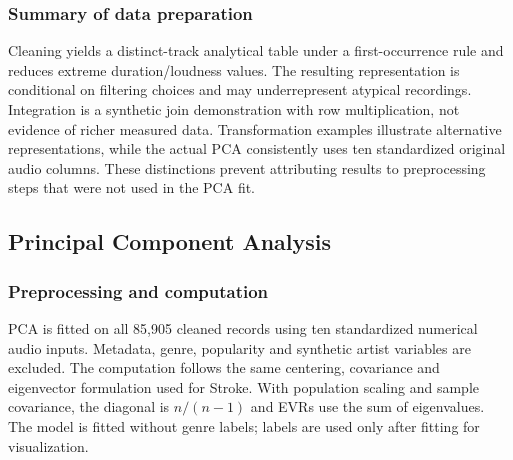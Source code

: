 \documentclass[12pt, a4paper]{article}
\begin{document}
\subsubsection{Summary of data preparation}
Cleaning yields a distinct-track analytical table under a first-occurrence rule and reduces extreme duration/loudness values. The resulting representation is conditional on filtering choices and may underrepresent atypical recordings. Integration is a synthetic join demonstration with row multiplication, not evidence of richer measured data. Transformation examples illustrate alternative representations, while the actual PCA consistently uses ten standardized original audio columns. These distinctions prevent attributing results to preprocessing steps that were not used in the PCA fit.

\subsection{Principal Component Analysis}
\subsubsection{Preprocessing and computation}
PCA is fitted on all 85,905 cleaned records using ten standardized numerical audio inputs. Metadata, genre, popularity and synthetic artist variables are excluded. The computation follows the same centering, covariance and eigenvector formulation used for Stroke. With population scaling and sample covariance, the diagonal is $n/(n-1)$ and EVRs use the sum of eigenvalues. The model is fitted without genre labels; labels are used only after fitting for visualization.
\end{document}
